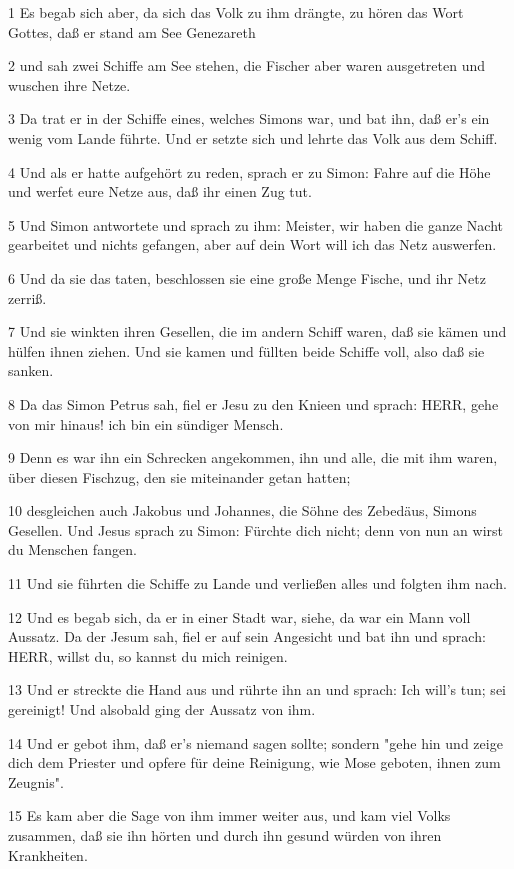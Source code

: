\par 1 Es begab sich aber, da sich das Volk zu ihm drängte, zu hören das Wort Gottes, daß er stand am See Genezareth
\par 2 und sah zwei Schiffe am See stehen, die Fischer aber waren ausgetreten und wuschen ihre Netze.
\par 3 Da trat er in der Schiffe eines, welches Simons war, und bat ihn, daß er's ein wenig vom Lande führte. Und er setzte sich und lehrte das Volk aus dem Schiff.
\par 4 Und als er hatte aufgehört zu reden, sprach er zu Simon: Fahre auf die Höhe und werfet eure Netze aus, daß ihr einen Zug tut.
\par 5 Und Simon antwortete und sprach zu ihm: Meister, wir haben die ganze Nacht gearbeitet und nichts gefangen, aber auf dein Wort will ich das Netz auswerfen.
\par 6 Und da sie das taten, beschlossen sie eine große Menge Fische, und ihr Netz zerriß.
\par 7 Und sie winkten ihren Gesellen, die im andern Schiff waren, daß sie kämen und hülfen ihnen ziehen. Und sie kamen und füllten beide Schiffe voll, also daß sie sanken.
\par 8 Da das Simon Petrus sah, fiel er Jesu zu den Knieen und sprach: HERR, gehe von mir hinaus! ich bin ein sündiger Mensch.
\par 9 Denn es war ihn ein Schrecken angekommen, ihn und alle, die mit ihm waren, über diesen Fischzug, den sie miteinander getan hatten;
\par 10 desgleichen auch Jakobus und Johannes, die Söhne des Zebedäus, Simons Gesellen. Und Jesus sprach zu Simon: Fürchte dich nicht; denn von nun an wirst du Menschen fangen.
\par 11 Und sie führten die Schiffe zu Lande und verließen alles und folgten ihm nach.
\par 12 Und es begab sich, da er in einer Stadt war, siehe, da war ein Mann voll Aussatz. Da der Jesum sah, fiel er auf sein Angesicht und bat ihn und sprach: HERR, willst du, so kannst du mich reinigen.
\par 13 Und er streckte die Hand aus und rührte ihn an und sprach: Ich will's tun; sei gereinigt! Und alsobald ging der Aussatz von ihm.
\par 14 Und er gebot ihm, daß er's niemand sagen sollte; sondern "gehe hin und zeige dich dem Priester und opfere für deine Reinigung, wie Mose geboten, ihnen zum Zeugnis".
\par 15 Es kam aber die Sage von ihm immer weiter aus, und kam viel Volks zusammen, daß sie ihn hörten und durch ihn gesund würden von ihren Krankheiten.

